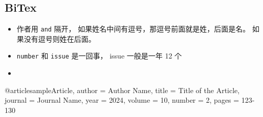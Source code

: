 

\subsection{BiTex}

\begin{itemize}
\item 作者用 \verb`and` 隔开， 如果姓名中间有逗号，那逗号前面就是姓，后面是名。 如果没有逗号则姓在后面。
\item \verb`number` 和 \verb`issue` 是一回事， issue 一般是一年 12 个
\item 
\end{itemize}

@article{sampleArticle,
  author  = {Author Name},
  title   = {Title of the Article},
  journal = {Journal Name},
  year    = {2024},
  volume  = {10},
  number  = {2},
  pages   = {123-130}
}
